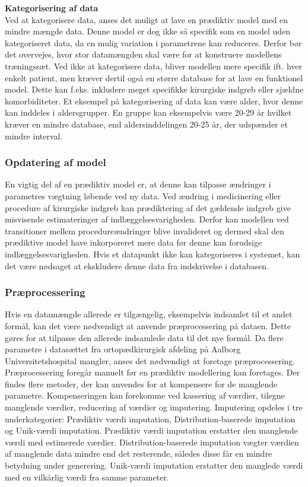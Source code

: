 \noindent
\textbf{Kategorisering af data} \\
\noindent
Ved at kategorisere data, anses det muligt at lave en prædiktiv model med en mindre mængde data. Denne model er dog ikke så specifik som en model uden kategoriseret data, da en mulig variation i parametrene kan reduceres.\cite{Rowan2007} 
Derfor bør det overvejes, hvor stor datamængden skal være for at konstruere modellens træningssæt. Ved ikke at kategorisere data, bliver modellen mere specifik ift. hver enkelt patient, men kræver dertil også en større database for at lave en funktionel model. Dette kan f.eks. inkludere meget specifikke kirurgiske indgreb eller sjældne komorbiditeter. 
Et eksempel på kategorisering af data kan være alder, hvor denne kan inddeles i aldersgrupper. En gruppe kan eksempelvis være 20-29 år hvilket kræver en mindre database, end aldersinddelingen 20-25 år, der udspænder et mindre interval.\cite{Rowan2007}  

\subsubsection{Opdatering af model}
En vigtig del af en prædiktiv model er, at denne kan tilpasse ændringer i parametres vægtning løbende ved ny data.\cite{Kuhn2013} Ved ændring i medicinering eller procedure af kirurgiske indgreb kan prædiktering af det gældende indgreb give misvisende estimateringer af indlæggelsesvarigheden. Derfor kan modellen ved transitioner mellem procedureændringer blive invalideret og dermed skal den prædiktive model have inkorporeret mere data før denne kan forudsige indlæggelsesvarigheden. 
Hvis et datapunkt ikke kan kategoriseres i systemet, kan det være nødsaget at ekskludere denne data fra indskrivelse i databasen.


\subsubsection{Præprocessering}
Hvis en datamængde allerede er tilgængelig, eksempelvis indsamlet til et andet formål, kan det være nødvendigt at anvende præprocessering på dataen. Dette gøres for at tilpasse den allerede indsamlede data til det nye formål.
Da flere parametre i datasættet fra ortopædkirurgisk afdeling på Aalborg Universitetshospital mangler, anses det nødvendigt at foretage præprocessering. Præprocessering foregår manuelt før en prædiktiv modellering kan foretages.
Der findes flere metoder, der kan anvendes for at kompensere for de manglende parametre. Kompenseringen kan forekomme ved kassering af værdier, tilegne manglende værdier, reducering af værdier og imputering. Imputering opdeles i tre underkategorier: Prædiktiv værdi imputation, Distribution-baserede imputation og Unik-værdi imputation. Prædiktiv værdi imputation erstatter den manglende værdi med estimerede værdier. Distribution-baserede imputation vægter værdien af manglende data mindre end det resterende, således disse får en mindre betydning under generering. Unik-værdi imputation erstatter den manglede værdi med en vilkårlig værdi fra samme parameter.\cite{Saar2007} 

